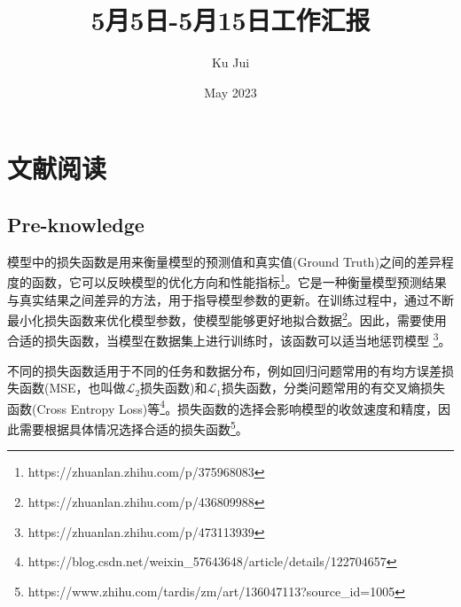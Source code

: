 \documentclass[letterpaper,12pt]{article}
\begin{document}
	
	
	\title{\songti {}5月5日-5月15日工作汇报}
	\author{\textrm{Ku Jui}}
	\date{\textrm{May 2023}}
	\maketitle
	
	\renewcommand{\figurename}{Figure} %
	\renewcommand{\contentsname}{Contents}
	
	\tableofcontents  %
	
	\section{文献阅读}

	\subsection{Pre-knowledge}
	
	模型中的损失函数是用来衡量模型的预测值和真实值(Ground Truth)之间的差异程度的函数，它可以反映模型的优化方向和性能指标\footnote{https://zhuanlan.zhihu.com/p/375968083}。它是一种衡量模型预测结果与真实结果之间差异的方法，用于指导模型参数的更新。在训练过程中，通过不断最小化损失函数来优化模型参数，使模型能够更好地拟合数据\footnote{https://zhuanlan.zhihu.com/p/436809988}。因此，需要使用合适的损失函数，当模型在数据集上进行训练时，该函数可以适当地惩罚模型 \footnote{https://zhuanlan.zhihu.com/p/473113939}。
	
	不同的损失函数适用于不同的任务和数据分布，例如回归问题常用的有均方误差损失函数(MSE，也叫做$\mathcal{L}_{2}$损失函数)和$\mathcal{L}_{1}$损失函数，分类问题常用的有交叉熵损失函数(Cross Entropy Loss)等\footnote{https://blog.csdn.net/weixin\_57643648/article/details/122704657}。损失函数的选择会影响模型的收敛速度和精度，因此需要根据具体情况选择合适的损失函数\footnote{https://www.zhihu.com/tardis/zm/art/136047113?source\_id=1005}。
	
\end{document}
